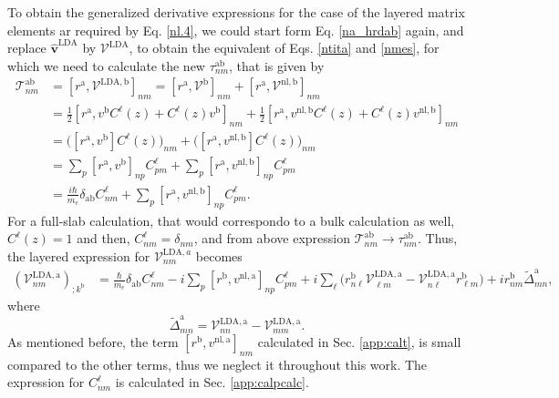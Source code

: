 To obtain the generalized derivative expressions for the case of the layered
matrix elements ar required by Eq. \eqref{nl.4}, we could start form
Eq. \eqref{na_hrdab} again, and replace $\hat{\mathbf{v}}^\mathrm{LDA}$ by
$\boldsymbol{\mathcal{V}}^\mathrm{LDA}$, to obtain the equivalent of
Eqs. \eqref{ntita} and \eqref{nmes}, for which we need to calculate the new
$\tau^{\mathrm{a}\mathrm{b}}_{nm}$, that is given by
\begin{align}\label{na_hrdab-n}
\mathcal{T}^{\mathrm{a}\mathrm{b}}_{nm}&=
[r^{\mathrm{a}},\mathcal{V}^{\mathrm{LDA},\mathrm{b}}]_{nm}
= [r^{\mathrm{a}},\mathcal{V}^\mathrm{b}]_{nm}+
[r^{\mathrm{a}},\mathcal{V}^{\mathrm{nl},\mathrm{b}}]_{nm}
\nonumber\\
&= \frac{1}{2}
[r^{\mathrm{a}},v^\mathrm{b} C^{\ell}(z)+C^{\ell}(z) v^\mathrm{b}]_{nm} 
+ \frac{1}{2}
[r^{\mathrm{a}},v^{\mathrm{nl},\mathrm{b}}C^{\ell}(z)+C^{\ell}(z) v^{\mathrm{nl},\mathrm{b}}]_{nm} 
\nonumber\\
&=
\Big([r^{\mathrm{a}},v^\mathrm{b}]C^{\ell}(z)\Big)_{nm} 
+
\Big(
[r^{\mathrm{a}},v^{\mathrm{nl},\mathrm{b}}] C^{\ell}(z)\Big)_{nm} 
\nonumber\\
&=
\sum_p[r^{\mathrm{a}},v^\mathrm{b}]_{np}C^{\ell}_{pm} 
+
\sum_p 
[r^{\mathrm{a}},v^{\mathrm{nl},\mathrm{b}}]_{np}C^{\ell}_{pm} 
\nonumber\\
&=
\frac{i\hbar}{m_e}\delta_{\mathrm{a}\mathrm{b}} C^{\ell}_{nm} 
+
\sum_p 
[r^{\mathrm{a}},v^{\mathrm{nl},\mathrm{b}}]_{np}C^{\ell}_{pm} 
.
\end{align} 
For a full-slab calculation, that would correspondo to a bulk calculation as well, $C^{\ell}(z)=1$ and then, $C^{\ell}_{nm}=\delta_{nm}$, and from above expression $\mathcal{T}^{\mathrm{a}\mathrm{b}}_{nm}\to \tau^{\mathrm{a}\mathrm{b}}_{nm}$. Thus, the layered expression for $\mathcal{V}^{\mathrm{LDA},a}_{nm}$ becomes
\begin{align}\label{nmesn}
(\mathcal{V}^{\mathrm{LDA},\mathrm{a}}_{nm})_{;k^{\mathrm{b}}}&=
\frac{\hbar}{m_e}\delta_{\mathrm{a}\mathrm{b}}
C^{\ell}_{nm} 
-i
\sum_p 
[r^{\mathrm{b}},v^{\mathrm{nl},\mathrm{a}}]_{np}C^{\ell}_{pm} 
+i
\sum_{\ell}
\bigg(
r^{\mathrm{b}}_{n\ell}  
\mathcal{V}^{\mathrm{LDA},\mathrm{a}}_{\ell m}
-
\mathcal{V}^{\mathrm{LDA},\mathrm{a}}_{n\ell}   
r^{\mathrm{b}}_{\ell m}
\bigg)  
+i  
r^{\mathrm{b}}_{nm}
\tilde\Delta^{\mathrm{a}}_{mn}
,
\end{align}  
where
\begin{equation}\label{tdel}
\tilde\Delta^{\mathrm{a}}_{mn}
=
\mathcal{V}^{\mathrm{LDA},\mathrm{a}}_{nn}  
-
\mathcal{V}^{\mathrm{LDA},\mathrm{a}}_{mm}  
.
\end{equation}
As mentioned before, the term $[r^{\mathrm{b}},v^{\mathrm{nl},\mathrm{a}}]_{nm}$
calculated in Sec. \ref{app:calt}, is small compared to the other terms, thus we
neglect it throughout this work.\cite{valerie} The expression for
$C^{\ell}_{nm}$ is calculated in Sec. \ref{app:calpcalc}.


